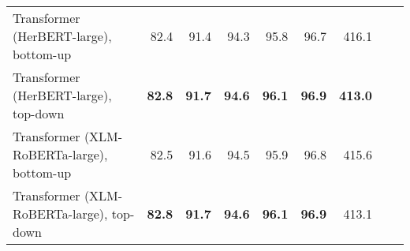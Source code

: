 \begin{table}[ht!]
{\begin{tabular}{lrrrrrrrr}
  Transformer (HerBERT-large), bottom-up & 82.4 & 91.4 & 94.3 & 95.8 & 96.7 & 416.1 \\ 
  Transformer (HerBERT-large), top-down & \textbf{82.8} & \textbf{91.7} & \textbf{94.6} & \textbf{96.1} & \textbf{96.9} & \textbf{413.0} \\ 
  Transformer (XLM-RoBERTa-large), bottom-up & 82.5 & 91.6 & 94.5 & 95.9 & 96.8 & 415.6 \\ 
  Transformer (XLM-RoBERTa-large), top-down & \textbf{82.8} & \textbf{91.7} & \textbf{94.6} & \textbf{96.1} & \textbf{96.9} & 413.1 \\ 
   \hline
\end{tabular}
}
\end{table}




